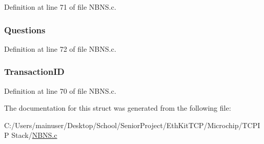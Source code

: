 Definition at line 71 of file N\+B\+N\+S.\+c.

\hypertarget{struct___n_b_n_s___h_e_a_d_e_r_afecf1635048108f6024d67f09c6cb96d}{}
\subsubsection[{Questions}]{ Questions}\label{struct___n_b_n_s___h_e_a_d_e_r_afecf1635048108f6024d67f09c6cb96d}


Definition at line 72 of file N\+B\+N\+S.\+c.

\hypertarget{struct___n_b_n_s___h_e_a_d_e_r_a5a0dfb5b1d8d29e0a0be61eeaae10de1}{}
\subsubsection[{Transaction\+I\+D}]{ Transaction\+I\+D}\label{struct___n_b_n_s___h_e_a_d_e_r_a5a0dfb5b1d8d29e0a0be61eeaae10de1}


Definition at line 70 of file N\+B\+N\+S.\+c.



The documentation for this struct was generated from the following file\+:\begin{DoxyCompactItemize}
\item 
C\+:/\+Users/mainuser/\+Desktop/\+School/\+Senior\+Project/\+Eth\+Kit\+T\+C\+P/\+Microchip/\+T\+C\+P\+I\+P Stack/\hyperlink{_n_b_n_s_8c}{N\+B\+N\+S.\+c}\end{DoxyCompactItemize}
